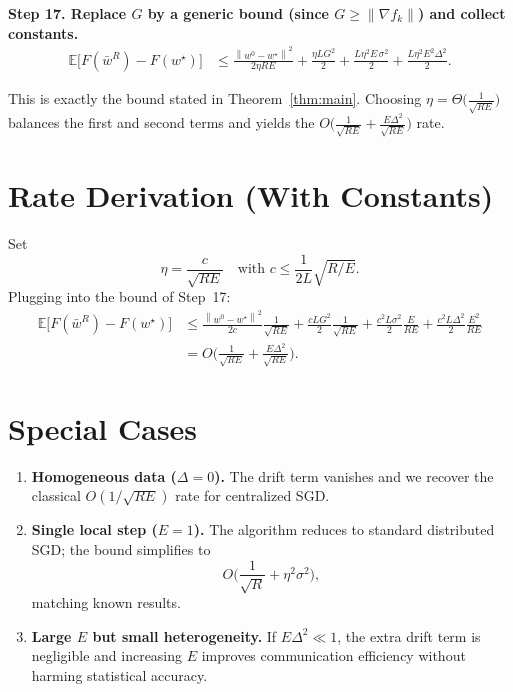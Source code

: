 \documentclass{article}
\newcommand{\E}{\mathbb{E}}
\newcommand{\norm}[1]{\left\lVert#1\right\rVert}
\begin{document}
\noindent\textbf{Step 17.  Replace $G$ by a generic bound (since $G\ge\|\nabla f_k\|$) and collect constants.}
\[
\boxed{
\begin{aligned}
    \E\!\big[F(\bar w^{R})-F(w^{\star})\big]
    &\le
    \frac{\norm{w^{0}-w^{\star}}^{2}}{2\eta RE}
    +\frac{\eta L G^{2}}{2}
    +\frac{L\eta^{2}E\,\sigma^{2}}{2}
    +\frac{L\eta^{2}E^{2}\Delta^{2}}{2}.
\end{aligned}}
\tag{Step 17}
\]

This is exactly the bound stated in Theorem~\ref{thm:main}.  Choosing $\eta=\Theta\!\big(\frac{1}{\sqrt{RE}}\big)$ balances the first and second terms and yields the $O\!\big(\frac{1}{\sqrt{RE}}+\frac{E\Delta^{2}}{\sqrt{RE}}\big)$ rate.

\section*{Rate Derivation (With Constants)}
Set
\[
    \eta = \frac{c}{\sqrt{RE}}\quad\text{with }c\le\frac{1}{2L}\sqrt{R/E}.
\]
Plugging into the bound of Step~17:
\[
\begin{aligned}
    \E\!\big[F(\bar w^{R})-F(w^{\star})\big]
    &\le
    \frac{\norm{w^{0}-w^{\star}}^{2}}{2c}\frac{1}{\sqrt{RE}}
    +\frac{cL G^{2}}{2}\frac{1}{\sqrt{RE}}
    +\frac{c^{2}L\sigma^{2}}{2}\frac{E}{RE}
    +\frac{c^{2}L\Delta^{2}}{2}\frac{E^{2}}{RE}\\[4pt]
    &=
    O\!\Big(\frac{1}{\sqrt{RE}}+\frac{E\Delta^{2}}{\sqrt{RE}}\Big).
\end{aligned}
\]

\section*{Special Cases}
\begin{enumerate}[label=\alph*)]
    \item \textbf{Homogeneous data ($\Delta=0$).}  The drift term vanishes and we recover the classical $O(1/\sqrt{RE})$ rate for centralized SGD.
    \item \textbf{Single local step ($E=1$).}  The algorithm reduces to standard distributed SGD; the bound simplifies to
    \[
        O\!\Big(\frac{1}{\sqrt{R}}+\eta^{2}\sigma^{2}\Big),
    \]
    matching known results.
    \item \textbf{Large $E$ but small heterogeneity.}  If $E\Delta^{2}\ll 1$, the extra drift term is negligible and increasing $E$ improves communication efficiency without harming statistical accuracy.
\end{enumerate}
\end{document}
